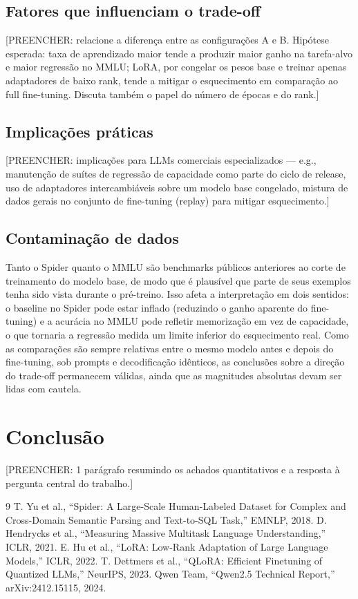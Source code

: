 \documentclass[conference]{IEEEtran}
\begin{document}
\subsection{Fatores que influenciam o trade-off}
[PREENCHER: relacione a diferença entre as configurações A e B. Hipótese
esperada: taxa de aprendizado maior tende a produzir maior ganho na
tarefa-alvo e maior regressão no MMLU; LoRA, por congelar os pesos base
e treinar apenas adaptadores de baixo rank, tende a mitigar o
esquecimento em comparação ao full fine-tuning. Discuta também o papel
do número de épocas e do rank.]

\subsection{Implicações práticas}
[PREENCHER: implicações para LLMs comerciais especializados ---
e.g., manutenção de suítes de regressão de capacidade como parte do
ciclo de release, uso de adaptadores intercambiáveis sobre um modelo
base congelado, mistura de dados gerais no conjunto de fine-tuning
(replay) para mitigar esquecimento.]

\subsection{Contaminação de dados}
Tanto o Spider quanto o MMLU são benchmarks públicos anteriores ao corte
de treinamento do modelo base, de modo que é plausível que parte de seus
exemplos tenha sido vista durante o pré-treino. Isso afeta a
interpretação em dois sentidos: o baseline no Spider pode estar inflado
(reduzindo o ganho aparente do fine-tuning) e a acurácia no MMLU pode
refletir memorização em vez de capacidade, o que tornaria a regressão
medida um limite inferior do esquecimento real. Como as comparações são
sempre relativas entre o mesmo modelo antes e depois do fine-tuning, sob
prompts e decodificação idênticos, as conclusões sobre a direção do
trade-off permanecem válidas, ainda que as magnitudes absolutas devam
ser lidas com cautela.

\section{Conclusão}
[PREENCHER: 1 parágrafo resumindo os achados quantitativos e a resposta
à pergunta central do trabalho.]

\begin{thebibliography}{9}
 T. Yu et al., ``Spider: A Large-Scale Human-Labeled
Dataset for Complex and Cross-Domain Semantic Parsing and Text-to-SQL
Task,'' EMNLP, 2018.
 D. Hendrycks et al., ``Measuring Massive Multitask
Language Understanding,'' ICLR, 2021.
 E. Hu et al., ``LoRA: Low-Rank Adaptation of Large
Language Models,'' ICLR, 2022.
 T. Dettmers et al., ``QLoRA: Efficient Finetuning of
Quantized LLMs,'' NeurIPS, 2023.
 Qwen Team, ``Qwen2.5 Technical Report,'' arXiv:2412.15115,
2024.
\end{thebibliography}
\end{document}
